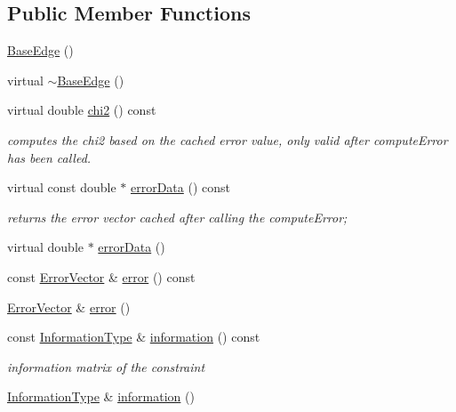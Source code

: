 \subsection*{Public Member Functions}
\begin{DoxyCompactItemize}
\item 
\mbox{\hyperlink{classg2o_1_1_base_edge_a5efd0eb7e76a7f1ad723e7a5896a54d5}{Base\+Edge}} ()
\item 
virtual \mbox{\hyperlink{classg2o_1_1_base_edge_a92a5cba950b867f9ff10b8154291087c}{$\sim$\+Base\+Edge}} ()
\item 
virtual double \mbox{\hyperlink{classg2o_1_1_base_edge_a8316137ded4396a2dbf7529d83888400}{chi2}} () const
\begin{DoxyCompactList}\small\item\em computes the chi2 based on the cached error value, only valid after compute\+Error has been called. \end{DoxyCompactList}\item 
virtual const double $\ast$ \mbox{\hyperlink{classg2o_1_1_base_edge_ad99fce6bad0207979b6211ac0d589015}{error\+Data}} () const
\begin{DoxyCompactList}\small\item\em returns the error vector cached after calling the compute\+Error; \end{DoxyCompactList}\item 
virtual double $\ast$ \mbox{\hyperlink{classg2o_1_1_base_edge_ab80452c1134036928a2af6303412a3c4}{error\+Data}} ()
\item 
const \mbox{\hyperlink{classg2o_1_1_base_edge_af5b558dd24e4be2e437563cae4b3550d}{Error\+Vector}} \& \mbox{\hyperlink{classg2o_1_1_base_edge_ab5a17b29aa9be942157e089bb363a46c}{error}} () const
\item 
\mbox{\hyperlink{classg2o_1_1_base_edge_af5b558dd24e4be2e437563cae4b3550d}{Error\+Vector}} \& \mbox{\hyperlink{classg2o_1_1_base_edge_ad0a9e3b6d5490c8f4af794c77742faae}{error}} ()
\item 
const \mbox{\hyperlink{classg2o_1_1_base_edge_a2e5a33343ac3f189d8a7d5ee4d8b73fc}{Information\+Type}} \& \mbox{\hyperlink{classg2o_1_1_base_edge_a405f8d52738e557a0860b52ac67a005b}{information}} () const
\begin{DoxyCompactList}\small\item\em information matrix of the constraint \end{DoxyCompactList}\item 
\mbox{\hyperlink{classg2o_1_1_base_edge_a2e5a33343ac3f189d8a7d5ee4d8b73fc}{Information\+Type}} \& \mbox{\hyperlink{classg2o_1_1_base_edge_addff9120320d63504e07bfe17f1d04a7}{information}} ()

\end{DoxyCompactItemize}
